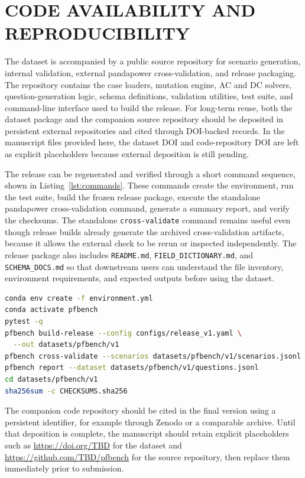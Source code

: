 \section*{CODE AVAILABILITY AND REPRODUCIBILITY}

The dataset is accompanied by a public source repository for scenario generation, internal validation, external pandapower cross-validation, and release packaging. The repository contains the case loaders, mutation engine, AC and DC solvers, question-generation logic, schema definitions, validation utilities, test suite, and command-line interface used to build the release. For long-term reuse, both the dataset package and the companion source repository should be deposited in persistent external repositories and cited through DOI-backed records. In the manuscript files provided here, the dataset DOI and code-repository DOI are left as explicit placeholders because external deposition is still pending.

The release can be regenerated and verified through a short command sequence, shown in Listing~\ref{lst:commands}. These commands create the environment, run the test suite, build the frozen release package, execute the standalone pandapower cross-validation command, generate a summary report, and verify the checksums. The standalone \texttt{cross-validate} command remains useful even though release builds already generate the archived cross-validation artifacts, because it allows the external check to be rerun or inspected independently. The release package also includes \texttt{README.md}, \texttt{FIELD\_DICTIONARY.md}, and \texttt{SCHEMA\_DOCS.md} so that downstream users can understand the file inventory, environment requirements, and expected outputs before using the dataset.

\begin{lstlisting}[language=bash,caption={Representative commands for reproducing, cross-validating, and packaging the frozen release. Repository and DOI placeholders should be replaced before submission.},label={lst:commands}]
conda env create -f environment.yml
conda activate pfbench
pytest -q
pfbench build-release --config configs/release_v1.yaml \
  --out datasets/pfbench/v1
pfbench cross-validate --scenarios datasets/pfbench/v1/scenarios.jsonl
pfbench report --dataset datasets/pfbench/v1/questions.jsonl
cd datasets/pfbench/v1
sha256sum -c CHECKSUMS.sha256
\end{lstlisting}

The companion code repository should be cited in the final version using a persistent identifier, for example through Zenodo or a comparable archive. Until that deposition is complete, the manuscript should retain explicit placeholders such as \url{https://doi.org/TBD} for the dataset and \url{https://github.com/TBD/pfbench} for the source repository, then replace them immediately prior to submission.


